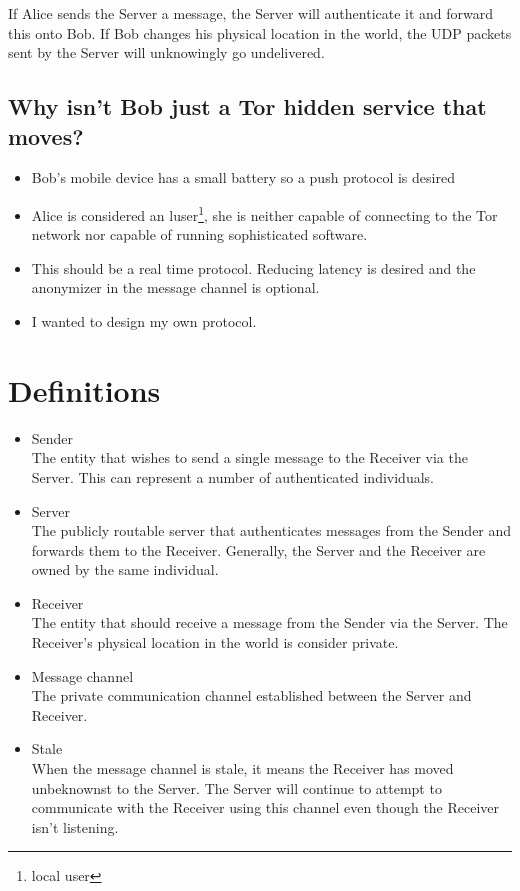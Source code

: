 \documentclass[11pt]{article}
\begin{document}
If Alice sends the Server a message, the Server will authenticate it and
forward this onto Bob. If Bob changes his physical location in the world, the
UDP packets sent by the Server will unknowingly go undelivered.

\subsection*{Why isn't Bob just a Tor hidden service that moves?}
\begin{itemize}
\item Bob's mobile device has a small battery so a push protocol is desired
\item Alice is considered an luser\footnote{local user}, she is neither capable
of connecting to the Tor network nor capable of running sophisticated software.
\item This should be a real time protocol. Reducing latency is desired and the
anonymizer in the message channel is optional.
\item I wanted to design my own protocol.
\end{itemize}

\pagebreak
\section*{Definitions}
\begin{itemize}
\item Sender \\
The entity that wishes to send a single message to the Receiver via the Server.
This can represent a number of authenticated individuals.
\item Server \\
The publicly routable server that authenticates messages from the Sender and
forwards them to the Receiver. Generally, the Server and the Receiver are
owned by the same individual.
\item Receiver \\
The entity that should receive a message from the Sender via the Server. The
Receiver's physical location in the world is consider private.
\item Message channel \\
The private communication channel established between the Server and Receiver.
\item Stale \\
When the message channel is stale, it means the Receiver has moved unbeknownst
to the Server. The Server will continue to attempt to communicate with the
Receiver using this channel even though the Receiver isn't listening.
\end{itemize}
\pagebreak
\end{document}
